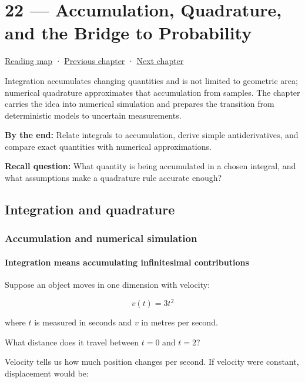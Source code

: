 \hypertarget{02-foundations-ii-ch022}{}
\section{22 --- Accumulation, Quadrature, and the Bridge to Probability}\label{accumulation-quadrature-and-the-bridge-to-probability}

\href{Chapter\%20Edition/01\%20-\%20Computing\%20Foundations/00\%20-\%20Reading\%20Map}{Reading map} · \hyperref[02-foundations-ii-ch021]{Previous chapter} · \hyperref[02-foundations-ii-ch023]{Next chapter}

Integration accumulates changing quantities and is not limited to geometric area; numerical quadrature approximates that accumulation from samples. The chapter carries the idea into numerical simulation and prepares the transition from deterministic models to uncertain measurements.

\textbf{By the end:} Relate integrals to accumulation, derive simple antiderivatives, and compare exact quantities with numerical approximations.

\textbf{Recall question:} What quantity is being accumulated in a chosen integral, and what assumptions make a quadrature rule accurate enough?

\subsection{Integration and quadrature}\label{integration-and-quadrature}

\subsubsection{Accumulation and numerical simulation}\label{accumulation-and-numerical-simulation}

\paragraph{Integration means accumulating infinitesimal contributions}\label{integration-means-accumulating-infinitesimal-contributions}

Suppose an object moves in one dimension with velocity:

\[
v(t)=3t^2
\]

where \(t\) is measured in seconds and \(v\) in metres per second.

What distance does it travel between \(t=0\) and \(t=2\)?

Velocity tells us how much position changes per second. If velocity were constant, displacement would be:

